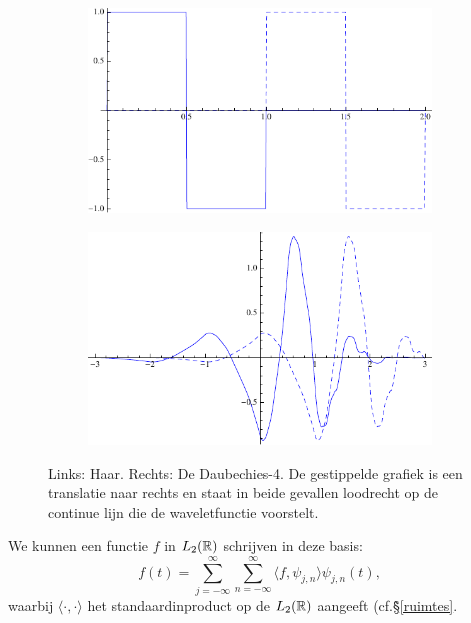 \begin{figure}[h]
  \centering
  \begin{subfigure}{0.48\linewidth}
    \includegraphics[width=\linewidth]{plaatjes/db1.pdf}
  \end{subfigure}
  \begin{subfigure}{0.48\linewidth}
    \includegraphics[width=\linewidth]{plaatjes/db4.pdf}
  \end{subfigure}
  \caption{Links: Haar. Rechts: De Daubechies-4. De gestippelde grafiek is een translatie naar rechts en staat in beide gevallen loodrecht op de continue lijn die de waveletfunctie voorstelt.}
\label{fig:wavelets}
\end{figure}

\begin{gevolg}We kunnen een functie $f$ in $L_2(\mathbb{R})$ schrijven in deze basis:
  \[
  f(t) = \sum_{j=-\infty}^{\infty} \sum_{n=-\infty}^{\infty} \langle f, \psi_{j,n} \rangle \psi_{j,n}(t),
  \]
  waarbij $\langle \cdot, \cdot \rangle$ het standaardinproduct op de $L_2(\mathbb{R})$ aangeeft (cf.\~\S \ref{ruimtes}.
\end{gevolg}

